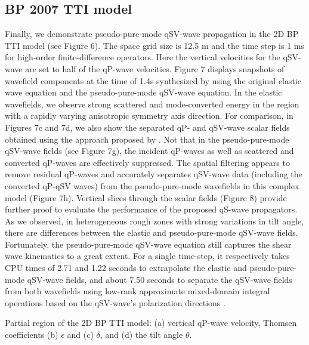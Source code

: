 \subsection{BP 2007 TTI model}

Finally, we demonstrate pseudo-pure-mode qSV-wave propagation in the 2D BP TTI model (see Figure 6).
The space grid size is 12.5 m and the time step is 1 ms for
high-order finite-difference operators. Here the vertical velocities for the qSV-wave are set to
 half of the qP-wave velocities.
Figure 7 displays snapshots of wavefield components at the time of 1.4s
synthesized by using the original elastic wave equation and the pseudo-pure-mode qSV-wave equation.
In the elastic wavefields, we observe strong scattered and mode-converted energy in the region with a rapidly varying 
anisotropic symmetry axis direction.
For comparison, in Figures 7c and 7d, we also show the separated qP- and qSV-wave scalar fields
	obtained using the approach proposed by \cite{cheng.fomel:2014}.
Not that in the pseudo-pure-mode qSV-wave fields (see Figure 7g), the incident qP-waves as well as
scattered and converted qP-waves are effectively suppressed.
The spatial filtering appears to remove residual qP-waves and accurately separates qSV-wave data
(including the converted qP-qSV waves) from the pseudo-pure-mode wavefields in this complex model (Figure 7h).
Vertical slices through the scalar fields (Figure 8) provide further proof to evaluate the performance
of the proposed qS-wave propagators.
As we observed, in heterogeneous rough zones with strong variations in tilt angle,
there are differences between the elastic and pseudo-pure-mode qSV-wave fields.
Fortunately, the pseudo-pure-mode qSV-wave equation still captures the shear wave kinematics to a great extent.
For a single time-step, it respectively takes CPU times of 2.71 and 1.22 seconds to extrapolate the elastic
and pseudo-pure-mode qSV-wave fields,
and about 7.50 seconds to separate the qSV-wave fields from both wavefields using low-rank approximate
mixed-domain integral operations based on the qSV-wave's polarization directions \cite[]{cheng.fomel:2014}.

{
Partial region of the 2D BP TTI model: (a) vertical qP-wave velocity, Thomsen coefficients
(b) $\epsilon$ and (c) $\delta$, and (d) the tilt angle $\theta$. 
}

